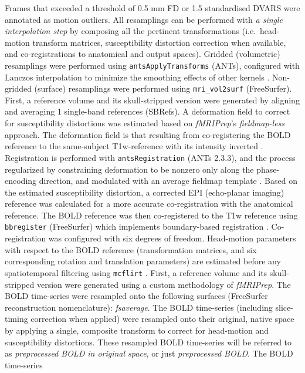 \documentclass[]{article}
\begin{document}
\begin{description}
Frames that exceeded a threshold of 0.5 mm FD or 1.5 standardised DVARS
were annotated as motion outliers. All resamplings can be performed with
\emph{a single interpolation step} by composing all the pertinent
transformations (i.e.~head-motion transform matrices, susceptibility
distortion correction when available, and co-registrations to anatomical
and output spaces). Gridded (volumetric) resamplings were performed
using \texttt{antsApplyTransforms} (ANTs), configured with Lanczos
interpolation to minimize the smoothing effects of other kernels
\citep{lanczos}. Non-gridded (surface) resamplings were performed using
\texttt{mri\_vol2surf} (FreeSurfer). First, a reference volume and its
skull-stripped version were generated by aligning and averaging 1
single-band references (SBRefs). A deformation field to correct for
susceptibility distortions was estimated based on \emph{fMRIPrep}'s
\emph{fieldmap-less} approach. The deformation field is that resulting
from co-registering the BOLD reference to the same-subject T1w-reference
with its intensity inverted \citep{fieldmapless1, fieldmapless2}.
Registration is performed with \texttt{antsRegistration} (ANTs 2.3.3),
and the process regularized by constraining deformation to be nonzero
only along the phase-encoding direction, and modulated with an average
fieldmap template \citep{fieldmapless3}. Based on the estimated
susceptibility distortion, a corrected EPI (echo-planar imaging)
reference was calculated for a more accurate co-registration with the
anatomical reference. The BOLD reference was then co-registered to the
T1w reference using \texttt{bbregister} (FreeSurfer) which implements
boundary-based registration \citep{bbr}. Co-registration was configured
with six degrees of freedom. Head-motion parameters with respect to the
BOLD reference (transformation matrices, and six corresponding rotation
and translation parameters) are estimated before any spatiotemporal
filtering using \texttt{mcflirt} \citep[FSL 5.0.9,][]{mcflirt}. First, a
reference volume and its skull-stripped version were generated using a
custom methodology of \emph{fMRIPrep}. The BOLD time-series were
resampled onto the following surfaces (FreeSurfer reconstruction
nomenclature): \emph{fsaverage}. The BOLD time-series (including
slice-timing correction when applied) were resampled onto their
original, native space by applying a single, composite transform to
correct for head-motion and susceptibility distortions. These resampled
BOLD time-series will be referred to as \emph{preprocessed BOLD in
original space}, or just \emph{preprocessed BOLD}. The BOLD time-series

\end{description}
\end{document}
